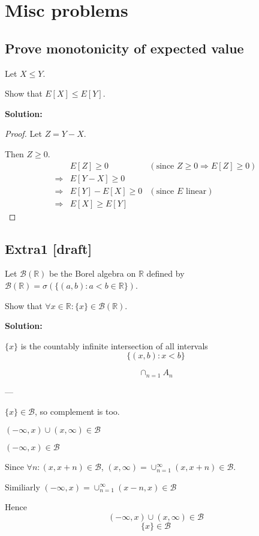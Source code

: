 \documentclass{article}
\begin{document}
\section{Misc problems}
\subsection{Prove monotonicity of expected value}
Let \(X\leq Y\).

Show that \(E[X]\leq E[Y]\).

\textbf{Solution:}

\begin{proof}
Let \(Z=Y-X\).

Then \(Z\geq 0\).
\begin{align*}
     & E[Z]\geq 0 & (\text{since }Z\geq 0 \Rightarrow E[Z]\geq 0) \\
    \Rightarrow& E[Y-X] \geq 0 \\
    \Rightarrow& E[Y]-E[X] \geq 0 & (\text{since }E\text{ linear}) \\
    \Rightarrow& E[X]\geq E[Y]
\end{align*}
\end{proof}

\subsection{Extra1 [draft]}

Let \(\mathcal{B}(\mathbb{R})\) be the Borel algebra on \(\mathbb{R}\)
defined by \(\mathcal{B}(\mathbb{R})=\sigma(\{(a,b): a<b \in \mathbb{R}\})\).

Show that \(\forall x \in \mathbb{R}:\{x\}\in \mathcal{B}(\mathbb{R})\).

\textbf{Solution:}

\(\{x\}\) is the countably infinite intersection of all intervals
\[\{(x,b):x<b\}\]

\[\cap_{n=1} A_n \]

---

\(\{x\} \in \mathcal{B}\), so complement is too.

\((-\infty,x)\cup (x,\infty)\in \mathcal{B}\)

\((-\infty,x)\in \mathcal{B}\)

Since \(\forall n: (x,x+n)\in \mathcal{B}\),
\((x,\infty)=\cup_{n=1}^\infty(x,x+n)\in \mathcal{B}\).

Similiarly
\((-\infty,x)=\cup_{n=1}^\infty (x-n,x)\in\mathcal{B}\)

Hence
\[(-\infty,x)\cup (x,\infty)\in \mathcal{B}\]
\[\{x\}\in \mathcal{B}\]
\end{document}
